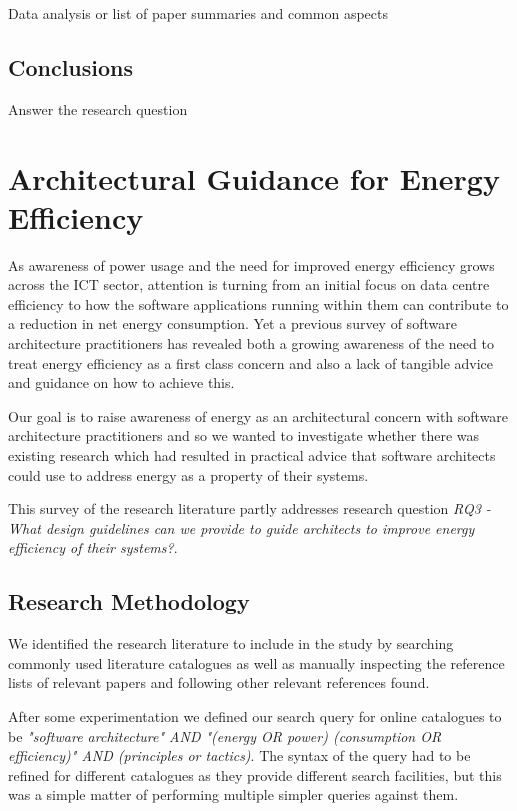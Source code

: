 Data analysis or list of paper summaries and common aspects

\subsection{Conclusions}

Answer the research question


\section{Architectural Guidance for Energy Efficiency}

As awareness of power usage and the need for improved energy efficiency grows across the ICT sector, attention is turning from an initial focus on data centre efficiency \cite{delforge2014-datacentreenergy} to how the software applications running within them can contribute to a reduction in net energy consumption.  Yet a previous survey of software architecture practitioners \cite{bashroush2016-datacentreenergy} has revealed both a growing awareness of the need to treat energy efficiency as a first class concern and also a lack of tangible advice and guidance on how to achieve this.

Our goal is to raise awareness of energy as an architectural concern with software architecture practitioners and so we wanted to investigate whether there was existing research which had resulted in practical advice that software architects could use to address energy as a property of their systems.

This survey of the research literature partly addresses research question \emph{RQ3 -  What design guidelines can we provide to guide architects to improve energy efficiency of their systems?}.

\subsection{Research Methodology}

We identified the research literature to include in the study by searching commonly used literature catalogues as well as manually inspecting the reference lists of relevant papers and following other relevant references found.

After some experimentation we defined our search query for online catalogues to be \emph{"software architecture" AND "(energy OR power) (consumption OR efficiency)" AND (principles or tactics)}.  The syntax of the query had to be refined for different catalogues as they provide different search facilities, but this was a simple matter of performing multiple simpler queries against them.

